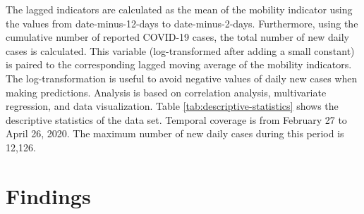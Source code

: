 \documentclass[]{elsarticle} %
\begin{document}
\begin{table}[!h]

\caption{\label{tab:descriptive-statistics}\label{tab:descriptive-statistics}Descriptive statistics of the data set}
\centering
{}
\end{table}

The lagged indicators are calculated as the mean of the mobility
indicator using the values from date-minus-12-days to date-minus-2-days.
Furthermore, using the cumulative number of reported COVID-19 cases, the
total number of new daily cases is calculated. This variable
(log-transformed after adding a small constant) is paired to the
corresponding lagged moving average of the mobility indicators. The
log-transformation is useful to avoid negative values of daily new cases
when making predictions. Analysis is based on correlation analysis,
multivariate regression, and data visualization. Table
\ref{tab:descriptive-statistics} shows the descriptive statistics of the
data set. Temporal coverage is from February 27 to April 26, 2020. The
maximum number of new daily cases during this period is 12,126.

\hypertarget{findings}{%
\section{Findings}\label{findings}}
\end{document}
